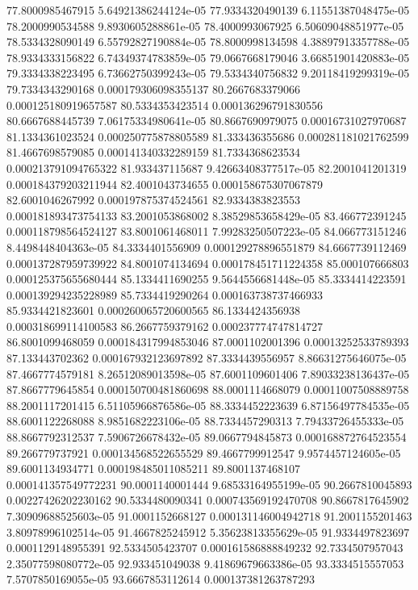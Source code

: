 {77.8000985467915 5.64921386244124e-05
77.9334320490139 6.11551387048475e-05
78.2000990534588 9.8930605288861e-05
78.4000993067925 6.50609048851977e-05
78.5334328090149 6.55792827190884e-05
78.8000998134598 4.38897913357788e-05
78.9334333156822 6.74349374783859e-05
79.0667668179046 3.66851901420883e-05
79.3334338223495 6.73662750399243e-05
79.5334340756832 9.20118419299319e-05
79.7334343290168 0.000179306098355137
80.2667683379066 0.000125180919657587
80.5334353423514 0.000136296791830556
80.6667688445739 7.06175334980641e-05
80.8667690979075 0.00016731027970687
81.1334361023524 0.000250775878805589
81.333436355686 0.000281181021762599
81.4667698579085 0.000141340332289159
81.7334368623534 0.000213791094765322
81.933437115687 9.42663408377517e-05
82.2001041201319 0.000184379203211944
82.4001043734655 0.000158675307067879
82.6001046267992 0.000197875374524561
82.9334383823553 0.000181893473754133
83.2001053868002 8.38529853658429e-05
83.466772391245 0.000118798564524127
83.8001061468011 7.99283250507223e-05
84.066773151246 8.4498448404363e-05
84.3334401556909 0.000129278896551879
84.6667739112469 0.000137287959739922
84.8001074134694 0.000178451711224358
85.000107666803 0.000125375655680444
85.1334411690255 9.5644556681448e-05
85.3334414223591 0.000139294235228989
85.7334419290264 0.000163738737466933
85.9334421823601 0.000260065720600565
86.1334424356938 0.000318699114100583
86.2667759379162 0.000237774747814727
86.8001099468059 0.000184317994853046
87.0001102001396 0.00013252533789393
87.133443702362 0.000167932123697892
87.3334439556957 8.86631275646075e-05
87.4667774579181 8.26512089013598e-05
87.6001109601406 7.89033238136437e-05
87.8667779645854 0.000150700481860698
88.0001114668079 0.00011007508889758
88.2001117201415 6.51105966876586e-05
88.3334452223639 6.87156497784535e-05
88.6001122268088 8.9851682223106e-05
88.7334457290313 7.79433726455333e-05
88.8667792312537 7.5906726678432e-05
89.0667794845873 0.000168872764523554
89.266779737921 0.000134568522655529
89.4667799912547 9.9574457124605e-05
89.6001134934771 0.000198485011085211
89.8001137468107 0.000141357549772231
90.0001140001444 9.68533164955199e-05
90.2667810045893 0.00227426202230162
90.5334480090341 0.000743569192470708
90.8667817645902 7.30909688525603e-05
91.0001152668127 0.000131146004942718
91.2001155201463 3.80978996102514e-05
91.4667825245912 5.35623813355629e-05
91.9334497823697 0.0001129148955391
92.5334505423707 0.000161586888849232
92.7334507957043 2.35077598080772e-05
92.933451049038 9.41869679663386e-05
93.3334515557053 7.5707850169055e-05
93.6667853112614 0.000137381263787293
}
